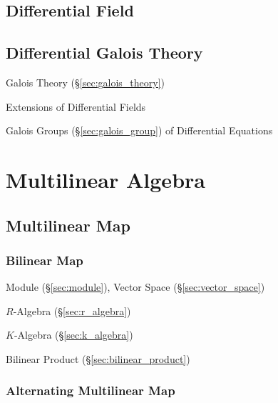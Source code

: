 \subsection{Differential Field}\label{sec:differential_field}

\subsection{Differential Galois Theory}\label{sec:differential_galois}

Galois Theory (\S\ref{sec:galois_theory})

Extensions of Differential Fields

Galois Groups (\S\ref{sec:galois_group}) of Differential Equations



\section{Multilinear Algebra}\label{sec:multilinear_algebra}

\subsection{Multilinear Map}\label{sec:multilinear_map}

\subsubsection{Bilinear Map}\label{sec:bilinear_map}

Module (\S\ref{sec:module}), Vector Space (\S\ref{sec:vector_space})

$R$-Algebra (\S\ref{sec:r_algebra})

$K$-Algebra (\S\ref{sec:k_algebra})

Bilinear Product (\S\ref{sec:bilinear_product})



\subsubsection{Alternating Multilinear Map}\label{sec:alternating_map}

